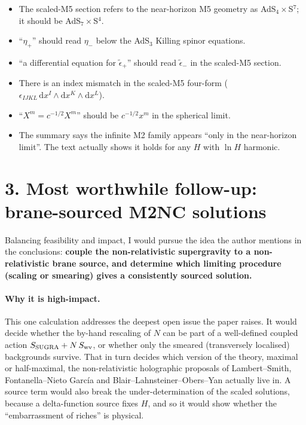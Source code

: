 \documentclass[11pt]{article}
\newcommand{\dd}{\mathrm{d}}
\begin{document}
\begin{itemize}
  \item The scaled-M5 section refers to the near-horizon M5 geometry as AdS$_4\times$S$^7$;
  it should be AdS$_7\times$S$^4$.
  \item ``$\eta_+$'' should read $\eta_-$ below the AdS$_3$ Killing spinor equations.
  \item ``a differential equation for $\tilde\epsilon_+$'' should read $\tilde\epsilon_-$ in
  the scaled-M5 section.
  \item There is an index mismatch in the scaled-M5 four-form
  ($\epsilon_{IJKL}\,\dd x^I\wedge\dd x^K\wedge\dd x^L$).
  \item ``$X^m=c^{-1/2}X^m$'' should be $c^{-1/2}x^m$ in the spherical limit.
  \item The summary says the infinite M2 family appears ``only in the near-horizon limit''.
  The text actually shows it holds for any $H$ with $\ln H$ harmonic.
\end{itemize}

\section*{3. Most worthwhile follow-up: brane-sourced M2NC solutions}

Balancing feasibility and impact, I would pursue the idea the author mentions in the
conclusions: \textbf{couple the non-relativistic supergravity to a non-relativistic brane
source, and determine which limiting procedure (scaling or smearing) gives a consistently
sourced solution.}

\paragraph{Why it is high-impact.} This one calculation addresses the deepest open issue the
paper raises. It would decide whether the by-hand rescaling of $N$ can be part of a
well-defined coupled action $S_{\rm SUGRA}+N\,S_{\rm wv}$, or whether only the smeared
(transversely localised) backgrounds survive. That in turn decides which version of the
theory, maximal or half-maximal, the non-relativistic holographic proposals of Lambert--Smith,
Fontanella--Nieto García and Blair--Lahnsteiner--Obers--Yan actually live in. A source term
would also break the under-determination of the scaled solutions, because a delta-function
source fixes $H$, and so it would show whether the ``embarrassment of riches'' is physical.
\end{document}
